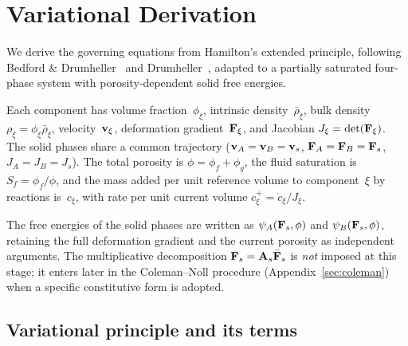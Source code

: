 \section{Variational Derivation}
\label{app:variational}
\label{sec:variational}

We derive the governing equations from Hamilton's extended principle, following Bedford \& Drumheller~\cite{drumheller1980thermomechanical} and Drumheller~\cite{drumheller2000}, adapted to a partially saturated four-phase system with porosity-dependent solid free energies.

Each component has volume fraction~$\phi_\xi$, intrinsic density~$\bar\rho_\xi$, bulk density $\rho_\xi = \phi_\xi\bar\rho_\xi$, velocity~$\mathbf{v}_\xi$, deformation gradient~$\mathbf{F}_\xi$, and Jacobian $J_\xi = \det(\mathbf{F}_\xi)$.  The solid phases share a common trajectory ($\mathbf{v}_A = \mathbf{v}_B = \mathbf{v}_s$, $\mathbf{F}_A = \mathbf{F}_B = \mathbf{F}_s$, $J_A = J_B = J_s$).  The total porosity is $\phi = \phi_f + \phi_g$, the fluid saturation is $S_f = \phi_f/\phi$, and the mass added per unit reference volume to component~$\xi$ by reactions is~$c_\xi$, with rate per unit current volume $c^+_\xi = \dot{c}_\xi / J_\xi$.

The free energies of the solid phases are written as $\psi_A(\mathbf{F}_s, \phi)$ and $\psi_B(\mathbf{F}_s, \phi)$, retaining the full deformation gradient and the current porosity as independent arguments.  The multiplicative decomposition $\mathbf{F}_s = \mathbf{A}_s \bar{\mathbf{F}}_s$ is \emph{not} imposed at this stage; it enters later in the Coleman--Noll procedure (Appendix~\ref{sec:coleman}) when a specific constitutive form is adopted.

\subsection{Variational principle and its terms}

